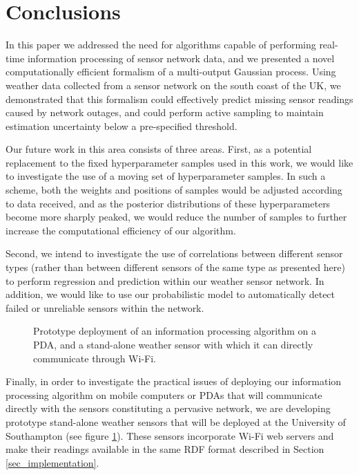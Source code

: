 \documentclass{acmtrans2m}
\begin{document}

\section{Conclusions}\label{sec_conclusion}

\noindent In this paper we addressed the need for algorithms capable of performing real-time information processing of sensor network data, and we presented a novel computationally efficient formalism of a multi-output Gaussian process. Using weather data collected from a sensor network on the south coast of the UK, we demonstrated that this formalism could effectively predict missing sensor readings caused by network outages, and could perform active sampling to maintain estimation uncertainty below a pre-specified threshold.

Our future work in this area consists of three areas. First, as a potential replacement to the fixed hyperparameter samples used in this work, we would like to investigate the use of a moving set of hyperparameter samples. In such a scheme, both the weights and positions of samples would be adjusted according to data received, and as the posterior distributions of these hyperparameters become more sharply peaked, we would reduce the number of samples to further increase the computational efficiency of our algorithm.

Second, we intend to investigate the use of correlations between different sensor types (rather than between different sensors of the same type as presented here) to perform regression and prediction within our weather sensor network. In addition, we would like to use our probabilistic model to automatically detect failed or unreliable sensors within the network. 

\begin{figure}
\begin{center}
\hspace{1.0cm}
\caption{Prototype deployment of an information processing algorithm on a PDA, and a stand-alone weather sensor with which it can directly communicate through Wi-Fi.}
\label{trimble}
\end{center}
\end{figure}

Finally, in order to investigate the practical issues of deploying our information processing algorithm on mobile computers or PDAs that will communicate directly with the sensors constituting a pervasive network, we are developing prototype stand-alone weather sensors that will be deployed at the University of Southampton (see figure \ref{trimble}). These sensors incorporate Wi-Fi web servers and make their readings available in the same RDF format described in Section \ref{sec_implementation}.
\end{document}
